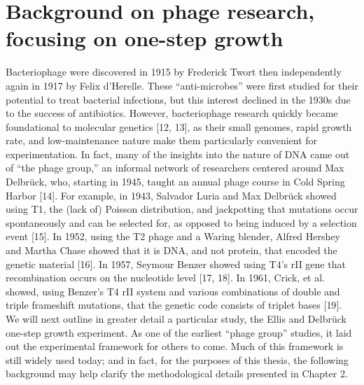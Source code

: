 \documentclass[12pt,twoside]{mitthesis-manusdown}
\begin{document}
\section{Background on phage research, focusing on one-step
growth}\label{background-on-phage-research-focusing-on-one-step-growth}

Bacteriophage were discovered in 1915 by Frederick Twort then
independently again in 1917 by Felix d'Herelle. These ``anti-microbes''
were first studied for their potential to treat bacterial infections,
but this interest declined in the 1930s due to the success of
antibiotics. However, bacteriophage research quickly became foundational
to molecular genetics {[}12, 13{]}, as their small genomes, rapid growth
rate, and low-maintenance nature make them particularly convenient for
experimentation. In fact, many of the insights into the nature of DNA
came out of ``the phage group,'' an informal network of researchers
centered around Max Delbrück, who, starting in 1945, taught an annual
phage course in Cold Spring Harbor {[}14{]}. For example, in 1943,
Salvador Luria and Max Delbrück showed using T1, the (lack of) Poisson
distribution, and jackpotting that mutations occur spontaneously and can
be selected for, as opposed to being induced by a selection event
{[}15{]}. In 1952, using the T2 phage and a Waring blender, Alfred
Hershey and Martha Chase showed that it is DNA, and not protein, that
encoded the genetic material {[}16{]}. In 1957, Seymour Benzer showed
using T4's rII gene that recombination occurs on the nucleotide level
{[}17, 18{]}. In 1961, Crick, et al. showed, using Benzer's T4 rII
system and various combinations of double and triple frameshift
mutations, that the genetic code consists of triplet bases {[}19{]}. We
will next outline in greater detail a particular study, the Ellis and
Delbrück one-step growth experiment. As one of the earliest ``phage
group'' studies, it laid out the experimental framework for others to
come. Much of this framework is still widely used today; and in fact,
for the purposes of this thesis, the following background may help
clarify the methodological details presented in Chapter 2.
\end{document}

